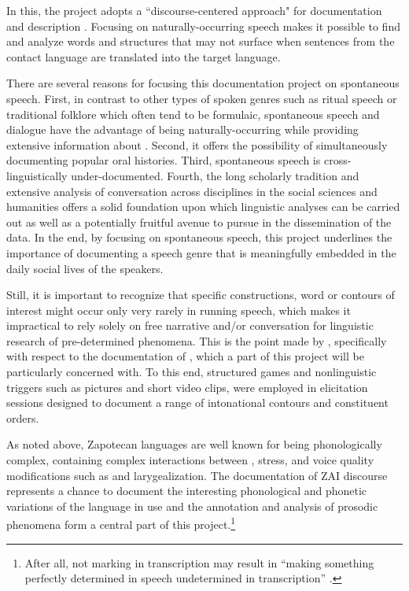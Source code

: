 In this, the project adopts a ``discourse-centered approach" for documentation and description \citep{sherzer1987}. Focusing on naturally-occurring speech makes it possible to find and analyze words and structures that may not surface when sentences from the contact language are translated into the target language. 

There are several reasons for focusing this documentation project on spontaneous speech. First, in contrast to other types of spoken genres such as ritual speech or traditional folklore which often tend to be formulaic, spontaneous speech and dialogue have the advantage of being naturally-occurring while providing extensive information about . Second, it offers the possibility of simultaneously documenting popular oral histories. Third, spontaneous speech is cross-linguistically under-documented. Fourth, the long scholarly tradition and extensive analysis of conversation across disciplines in the social sciences and humanities offers a solid foundation upon which linguistic analyses can be carried out as well as a potentially fruitful avenue to pursue in the dissemination of the data. In the end, by focusing on spontaneous speech, this project underlines the importance of documenting a speech genre that is meaningfully embedded in the daily social lives of the speakers. 

Still, it is important to recognize that specific constructions, word or  contours of interest might occur only very rarely in running speech, which makes it impractical to rely solely on free narrative and/or conversation for linguistic research of pre-determined phenomena. This is the point made by \citet{himmelmann2006}, specifically with respect to the documentation of , which a part of this project will be particularly concerned with. To this end, structured games and nonlinguistic triggers such as pictures and short video clips, were employed in elicitation sessions designed to document a range of intonational contours and constituent orders.

As noted above, Zapotecan languages are well known for being phonologically complex, containing complex interactions between , stress, and voice quality modifications such as  and larygealization. The documentation of ZAI discourse represents a chance to document the interesting phonological and phonetic variations of the language in use and the annotation and analysis of prosodic phenomena form a central part of this project.\footnote{After all, not marking  in transcription may result in ``making something perfectly determined in speech undetermined in transcription'' \citep[57]{scarano2009}.}  

